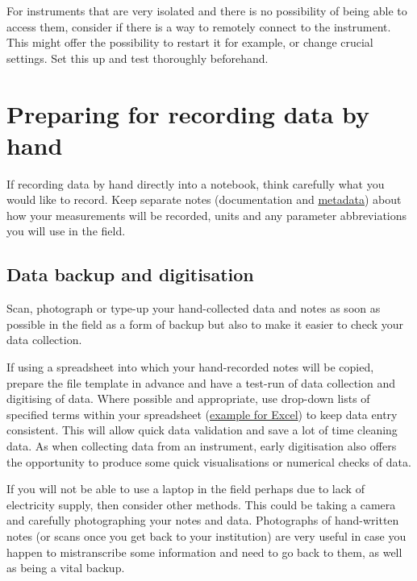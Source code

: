 \documentclass[12pt,a4paper,oneside]{report}
\begin{document}
For instruments that are very isolated and there is no possibility of
being able to access them, consider if there is a way to remotely
connect to the instrument. This might offer the possibility to restart
it for example, or change crucial settings. Set this up and test
thoroughly beforehand.

\hypertarget{preparing-for-recording-data-by-hand}{%
\section{Preparing for recording data by
hand}\label{preparing-for-recording-data-by-hand}}

If recording data by hand directly into a notebook, think carefully what
you would like to record. Keep separate notes (documentation and
\protect\hyperlink{metadata}{metadata}) about how your measurements will
be recorded, units and any parameter abbreviations you will use in the
field.

\hypertarget{data-backup-and-digitisation}{%
\subsection{Data backup and
digitisation}\label{data-backup-and-digitisation}}

Scan, photograph or type-up your hand-collected data and notes as soon
as possible in the field as a form of backup but also to make it easier
to check your data collection.

If using a spreadsheet into which your hand-recorded notes will be
copied, prepare the file template in advance and have a test-run of data
collection and digitising of data. Where possible and appropriate, use
drop-down lists of specified terms within your spreadsheet
(\href{https://www.excelefficiency.com/create-drop-down-lists-in-excel/}{example
for Excel}) to keep data entry consistent. This will allow quick data
validation and save a lot of time cleaning data. As when collecting data
from an instrument, early digitisation also offers the opportunity to
produce some quick visualisations or numerical checks of data.

If you will not be able to use a laptop in the field perhaps due to lack
of electricity supply, then consider other methods. This could be taking
a camera and carefully photographing your notes and data. Photographs of
hand-written notes (or scans once you get back to your institution) are
very useful in case you happen to mistranscribe some information and
need to go back to them, as well as being a vital backup.
\end{document}
